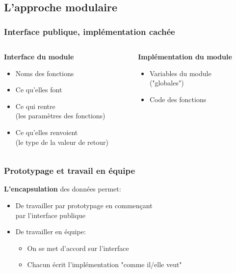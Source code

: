 \documentclass{beamer}
\begin{document}
  \subsection{L'approche modulaire}
  \begin{frame}
  \frametitle {Interface publique, implémentation cachée}

  \begin{columns}[t]

  \begin{column}{6cm}
  \textbf{Interface du module}
  \begin{itemize}
    \item{Noms des fonctions}
    \item{Ce qu'elles font}
    \item{Ce qui rentre \\ (les paramètres des fonctions)}
    \item{Ce qu'elles renvoient \\ (le type de la valeur de retour)}
  \end{itemize}
  \end{column}

  \begin{column}{6cm}
  \textbf{Implémentation du module}
  \begin{itemize}
     \item{Variables du module \\ ("globales")}
     \item{Code des fonctions}
  \end{itemize}
  \end{column}

  \end{columns}

  \end{frame}
  
  \begin{frame}
  \frametitle {Prototypage et travail en équipe}
  \textbf{L'encapsulation} des données permet:
    \begin{itemize}
    \item De travailler \alert{par prototypage} en commençant \\ par l'interface publique
    \item De travailler en équipe:
    \begin{itemize}
    \item On se met d'accord \alert{sur l'interface}
    \item Chacun écrit l'implémentation \alert{"comme il/elle veut"}
    \end{itemize}
    \end{itemize}
  \end{frame}

  
\end{document}
